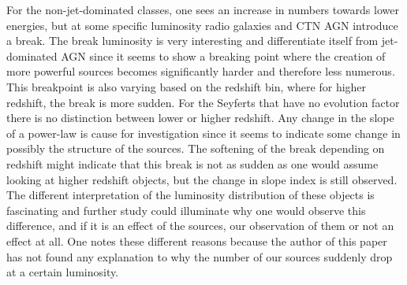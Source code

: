 For the non-jet-dominated classes, one sees an increase in numbers towards lower energies, but at some specific luminosity radio galaxies and CTN AGN introduce a break. The break luminosity is very interesting and differentiate itself 
from jet-dominated AGN since it seems to show 
a breaking point where the creation of more powerful sources becomes significantly harder and therefore less numerous. 
This breakpoint is also varying based on the redshift bin, where for higher redshift, the break is more sudden. For the Seyferts that have no evolution factor there is no distinction between lower or higher redshift.
Any change in the slope of a power-law is cause for investigation since it seems to indicate some change in possibly the structure of the sources. The softening of the break depending on redshift 
might indicate that this break is not as sudden as one would assume looking at higher redshift objects, but the change in slope index is still observed. 
The different interpretation of the luminosity distribution of these objects is fascinating and further study could illuminate why one would observe this difference, and if it is an effect of the sources, our observation of them or not an effect at all. One notes these different reasons because the author of this paper has not found any explanation to why the number of our sources suddenly drop at a certain luminosity. 



